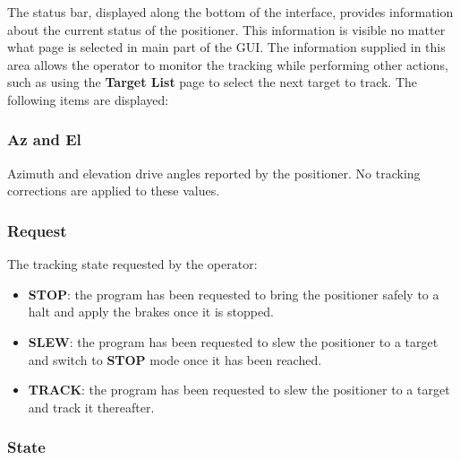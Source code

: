 \documentclass[letterpaper,12pt]{report}
\begin{document}
The status bar, displayed along the bottom of the interface, provides
information about the current status of the positioner. This
information is visible no matter what page is selected in main part of
the GUI. The information supplied in this area allows the operator to
monitor the tracking while performing other actions, such as using the
\textbf{Target List} page to select the next target to track. The
following items are displayed:

\subsubsection{Az and El} 

Azimuth and elevation drive angles reported by the positioner. No
tracking corrections are applied to these values.

\subsubsection{Request}

The tracking state requested by the operator:
\begin{itemize}
\item \textbf{STOP}: the program has been requested to bring the 
positioner safely to a halt and apply the brakes once it is
stopped.
\item \textbf{SLEW}: the program has been requested to 
slew the positioner to a target and switch to \textbf{STOP} mode once it
has been reached.
\item \textbf{TRACK}: the program has been requested to
slew the positioner to a target and track it thereafter.
\end{itemize}

\subsubsection{State}
\end{document}
